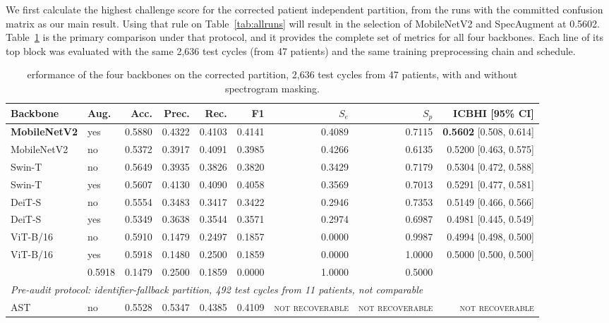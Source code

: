 \documentclass[journal,onecolumn]{IEEEtran}
\newcommand{\best}[1]{\textbf{#1}}
\newcommand{\notrec}{\textsc{not recoverable}}
\begin{document}
We first calculate the highest challenge score for the corrected patient independent partition, from the runs with the committed confusion matrix as our main result. Using that rule on Table~\ref{tab:allruns} will result in the selection of MobileNetV2 and SpecAugment at 0.5602. Table~\ref{tab:main} is the primary comparison under that protocol, and it provides the complete set of metrics for all four backbones. Each line of its top block was evaluated with the same 2,636 test cycles (from 47 patients) and the same training preprocessing chain and schedule.

\begin{table}[hbtp]
\centering
\caption{erformance of the four backbones on the corrected partition, 2,636 test cycles from 47 patients, with and without
spectrogram masking. }
\label{tab:main}
\footnotesize
\begin{tabular}{llrrrrrrr}
\toprule
Backbone & Aug. & Acc. & Prec. & Rec. & F1 & $S_e$ & $S_p$ & \best{ICBHI [95\% CI]} \\
\midrule
\best{MobileNetV2} & yes & 0.5880 & 0.4322 & 0.4103 & 0.4141 & 0.4089 & 0.7115 & \best{0.5602} [0.508, 0.614] \\
MobileNetV2 & no  & 0.5372 & 0.3917 & 0.4091 & 0.3985 & 0.4266 & 0.6135 & 0.5200 [0.463, 0.575] \\
Swin-T      & no  & 0.5649 & 0.3935 & 0.3826 & 0.3820 & 0.3429 & 0.7179 & 0.5304 [0.472, 0.588] \\
Swin-T      & yes & 0.5607 & 0.4130 & 0.4090 & 0.4058 & 0.3569 & 0.7013 & 0.5291 [0.477, 0.581] \\
DeiT-S      & no  & 0.5554 & 0.3483 & 0.3417 & 0.3422 & 0.2946 & 0.7353 & 0.5149 [0.466, 0.566] \\
DeiT-S      & yes & 0.5349 & 0.3638 & 0.3544 & 0.3571 & 0.2974 & 0.6987 & 0.4981 [0.445, 0.549] \\
ViT-B/16    & no  & 0.5910 & 0.1479 & 0.2497 & 0.1857 & 0.0000 & 0.9987 & 0.4994 [0.498, 0.500] \\
ViT-B/16    & yes & 0.5918 & 0.1480 & 0.2500 & 0.1859 & 0.0000 & 1.0000 & 0.5000 [0.500, 0.500] \\
\addlinespace
\multicolumn{2}{l}{\emph{Always-Normal baseline}} & 0.5918 & 0.1479 & 0.2500 & 0.1859 & 0.0000 & 1.0000 & 0.5000 \\
\midrule
\multicolumn{9}{l}{\emph{Pre-audit protocol: identifier-fallback partition, 492 test cycles from 11 patients, not comparable}}\\
AST & no & 0.5528 & 0.5347 & 0.4385 & 0.4109 & \notrec & \notrec & \notrec \\
\bottomrule
\end{tabular}

\vspace{2pt}
\footnotesize 
\end{table}
\end{document}
